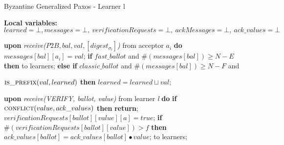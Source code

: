 \begin{algorithm}
	\caption{Byzantine Generalized Paxos - Learner l}
	\label{BFT-Learn}
	\textbf{Local variables: } $learned = \bot, messages = \bot,\ verificationRequests = \bot,\ ackMessages = \bot,\ ack\_values = \bot$ 
	\begin{algorithmic}[1]
		\State \textbf{upon} \textit{receive($P2B, bal, val, [digest_{\sigma_l}]$)} from acceptor $a_i$ \textbf{do}
		\State \hspace{\algorithmicindent} $messages[bal][a_i] = val$;
		\State \hspace{\algorithmicindent} \textbf{if} $fast\_ballot$ and $\#(messages[bal]) \geq N-E$ \textbf{then}
		\State\hspace{\algorithmicindent}\hspace{\algorithmicindent}  to learners;
		\State \hspace{\algorithmicindent} \textbf{else if} $classic\_ballot$ and $\#(messages[bal]) \geq N-F$ and
		\item[] \hspace{\algorithmicindent}\hspace{\algorithmicindent}$\Call{is\_prefix}{val, learned}$ \textbf{then}
		\State \hspace{\algorithmicindent} \hspace{\algorithmicindent} $learned = learned \sqcup val$;
		
		\State 
		\State \textbf{upon} \textit{receive(VERIFY, ballot, value)} from learner \textit{l} \textbf{do}
		\State \hspace{\algorithmicindent}\textbf{if} $\Call{conflict}{value, ack\_values}$ \textbf{then}
		\State\hspace{\algorithmicindent}\hspace{\algorithmicindent}\textbf{return};
		\State
		\State\hspace{\algorithmicindent}$verificationRequests[ballot][value][a] = true$;
		\State\hspace{\algorithmicindent}\textbf{if} $\#(verificationRequests[ballot][value]) > f$ \textbf{then}
		\State\hspace{\algorithmicindent} \hspace{\algorithmicindent}	$ack\_values[ballot] = ack\_values[ballot] \bullet value$;
		\State \hspace{\algorithmicindent} \hspace{\algorithmicindent}  to learners;
		

\end{algorithmic}
\end{algorithm}
